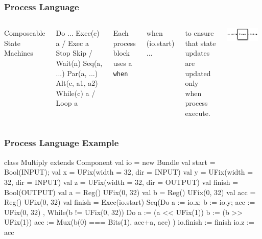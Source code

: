 \documentclass[xcolor=pdflatex,dvipsnames,table]{beamer}
\begin{document}
\begin{frame}[fragile]
\frametitle{Process Language}

\begin{columns}


Composeable State Machines
\begin{scala}
Do{ ... }
Exec(c){ a } / Exec{ a }
Stop
Skip / Wait(n)
Seq(a, ...)
Par(a, ...)
Alt(c, a1, a2)
While(c){ a } / Loop{ a }
\end{scala}

Each process block uses a \verb+when+
\begin{scala}
when (io.start) { ... }
\end{scala}
to ensure that state updates are updated only when process execute.


\begin{center}
\includegraphics[width=0.9\textwidth]{figs/process.pdf} \\
\end{center}

\end{columns}

\end{frame}

\begin{frame}
\frametitle{Process Language Example}

\begin{scala}
class Multiply extends Component {
  val io = new Bundle{ 
    val start  = Bool(INPUT);
    val x      = UFix(width = 32, dir = INPUT)
    val y      = UFix(width = 32, dir = INPUT)
    val z      = UFix(width = 32, dir = OUTPUT)
    val finish = Bool(OUTPUT) }
  val a   = Reg(){ UFix(0, 32) }
  val b   = Reg(){ UFix(0, 32) }
  val acc = Reg(){ UFix(0, 32) }
  val finish =
    Exec(io.start) {
      Seq(Do{ a := io.x; b := io.y; acc := UFix(0, 32) },
          While(b != UFix(0, 32)) {
            Do{ a   := (a << UFix(1)) 
                b   := (b >> UFix(1))
                acc := Mux(b(0) === Bits(1), acc+a, acc) } })
    }
  io.finish  := finish
  io.z       := acc
}
\end{scala}

\end{frame}
\end{document}
